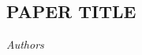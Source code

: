 \documentclass{article}
\begin{document}
\begin{center}
	\section*{\centering \Large PAPER TITLE}
\textit{\centering \large Authors}\\
\end{center}
\end{document}
